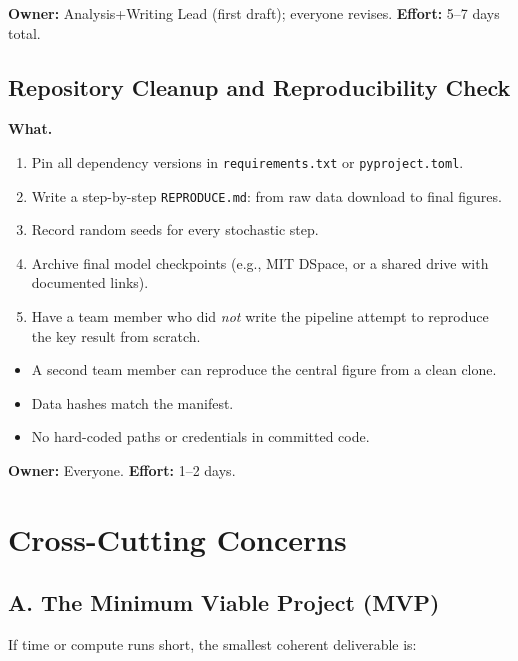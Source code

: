 \documentclass[11pt,a4paper]{article}
\begin{document}
\textbf{Owner:} Analysis+Writing Lead (first draft); everyone revises. \quad \textbf{Effort:} 5--7 days total.

\subsection{Repository Cleanup and Reproducibility Check}

\textbf{What.}
\begin{enumerate}[nosep]
  \item Pin all dependency versions in \texttt{requirements.txt} or \texttt{pyproject.toml}.
  \item Write a step-by-step \texttt{REPRODUCE.md}: from raw data download to final figures.
  \item Record random seeds for every stochastic step.
  \item Archive final model checkpoints (e.g., MIT DSpace, or a shared drive with documented links).
  \item Have a team member who did \emph{not} write the pipeline attempt to reproduce the key result from scratch.
\end{enumerate}

\begin{successbox}
  \begin{itemize}[nosep]
    \item A second team member can reproduce the central figure from a clean clone.
    \item Data hashes match the manifest.
    \item No hard-coded paths or credentials in committed code.
  \end{itemize}
\end{successbox}

\textbf{Owner:} Everyone. \quad \textbf{Effort:} 1--2 days.


\section*{Cross-Cutting Concerns}

\subsection*{A. The Minimum Viable Project (MVP)}

If time or compute runs short, the smallest coherent deliverable is:
\end{document}
